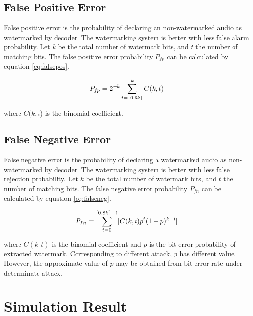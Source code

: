 \documentclass[12pt,a4paper]{report}
\DeclarePairedDelimiter{\ceil}{\lceil}{\rceil} %
\begin{document}
\section{False Positive Error}

False positive error is the probability of declaring an non-watermarked audio as watermarked by decoder. The watermarking system is better with less false alarm probability. Let $k$ be the total number of watermark bits, and $t$ the number of matching bits. The false positive error probability $ P_{fp} $ can be calculated by equation \ref{eq:falsepos}.

\bigskip

\begin{large}
\begin{equation} \label{eq:falsepos}
P_{fp} = 2^{-k} \sum_{t=\ceil{0.8k}}^{k} C(k,t)
\end{equation}
\end{large}

\bigskip

where $C(k,t$) is the binomial coefficient.

\section{False Negative Error}

False negative error is the probability of declaring a watermarked audio as non-watermarked by decoder. The watermarking system is better with less false rejection probability. Let $k$ be the total number of watermark bits, and $t$ the number of matching bits. The false negative error probability $ P_{fn} $ can be calculated by equation \ref{eq:falseneg}.

\bigskip

\begin{large}
\begin{equation} \label{eq:falseneg}
P_{fn} = \sum_{t=0}^{\ceil{0.8k}-1} [C(k,t)p^{t}(1-p)^{k-t}]
\end{equation}
\end{large}

\bigskip

where $C(k,t)$ is the binomial coefficient and $p$ is the bit error probability of extracted watermark. Corresponding to different attack, $p$ has different value. However, the approximate value of $p$ may be obtained from bit error rate under determinate attack.

\chapter{Simulation Result}
\end{document}
